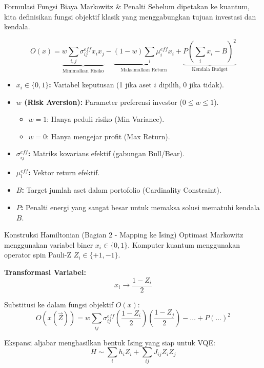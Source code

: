 \documentclass{beamer}
\begin{document}
\begin{frame}{Formulasi Fungsi Biaya Markowitz \& Penalti}
    Sebelum dipetakan ke kuantum, kita definisikan fungsi objektif klasik yang menggabungkan tujuan investasi dan kendala.
    
    $$ O(x) = \underbrace{w \sum_{i,j} \sigma_{ij}^{eff} x_i x_j}_{\text{Minimalkan Risiko}} - \underbrace{(1-w) \sum_i \mu_i^{eff} x_i}_{\text{Maksimalkan Return}} + \underbrace{P \left(\sum_i x_i - B\right)^2}_{\text{Kendala Budget}} $$

    \begin{itemize}
        \item \textbf{$x_i \in \{0,1\}$:} Variabel keputusan (1 jika aset $i$ dipilih, 0 jika tidak).
        \item \textbf{$w$ (Risk Aversion):} Parameter preferensi investor ($0 \le w \le 1$). 
            \begin{itemize}
                \item $w=1$: Hanya peduli risiko (Min Variance).
                \item $w=0$: Hanya mengejar profit (Max Return).
            \end{itemize}
        \item \textbf{$\sigma_{ij}^{eff}$:} Matriks kovarians efektif (gabungan Bull/Bear).
        \item \textbf{$\mu_i^{eff}$:} Vektor return efektif.
        \item \textbf{$B$:} Target jumlah aset dalam portofolio (Cardinality Constraint).
        \item \textbf{$P$:} Penalti energi yang sangat besar untuk memaksa solusi mematuhi kendala $B$.

    \end{itemize}
\end{frame}

\begin{frame}{Konstruksi Hamiltonian (Bagian 2 - Mapping ke Ising)}
    Optimasi Markowitz menggunakan variabel biner $x_i \in \{0, 1\}$. Komputer kuantum menggunakan operator spin Pauli-Z $Z_i \in \{+1, -1\}$.
    
    \textbf{Transformasi Variabel:}
    $$ x_i \rightarrow \frac{1-Z_i}{2} $$
    
    Substitusi ke dalam fungsi objektif $O(x)$:
    $$ O(x(\vec{Z})) = w \sum_{ij} \sigma_{ij}^{eff} \left(\frac{1-Z_i}{2}\right) \left(\frac{1-Z_j}{2}\right) - \dots + P(\dots)^2 $$
    
    Ekspansi aljabar menghasilkan bentuk Ising yang siap untuk VQE:
    $$ H \sim \sum_i h_i Z_i + \sum_{ij} J_{ij} Z_i Z_j $$
\end{frame}
\end{document}

